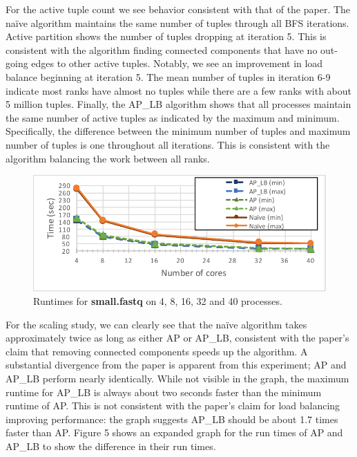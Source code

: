 \documentclass[11pt]{elsarticle}
\begin{document}
For the active tuple count we see behavior consistent with that of the paper. The na{\"i}ve algorithm maintains the same number of tuples through all BFS iterations. Active partition shows the number of tuples dropping at iteration 5. This is consistent with the algorithm finding connected components that have no out-going edges to other active tuples. Notably, we see an improvement in load balance beginning at iteration 5. The mean number of tuples in iteration 6-9 indicate most ranks have almost no tuples while there are a few ranks with about 5 million tuples. Finally, the AP\_LB algorithm shows that all processes maintain the same number of active tuples as indicated by the maximum and minimum. Specifically, the difference between the minimum number of tuples and maximum number of tuples is one throughout all iterations. This is consistent with the algorithm balancing the work between all ranks.
\begin{figure}
\centering
\includegraphics[width=.9\textwidth]{allruntimes}
\caption{Runtimes for \textbf{small.fastq} on 4, 8, 16, 32 and 40 processes.}
\end{figure}
For the scaling study, we can clearly see that the na{\"i}ve algorithm takes approximately twice as long as either AP or AP\_LB, consistent with the paper's claim that removing connected components speeds up the algorithm. A substantial divergence from the paper is apparent from this experiment; AP and AP\_LB perform nearly identically. While not visible in the graph, the maximum runtime for AP\_LB is always about two seconds faster than the minimum runtime of AP. This is not consistent with the paper's claim for load balancing improving performance: the graph suggests AP\_LB should be about 1.7 times faster than AP. Figure 5 shows an expanded graph for the run times of AP and AP\_LB to show the difference in their run times.
\end{document}
